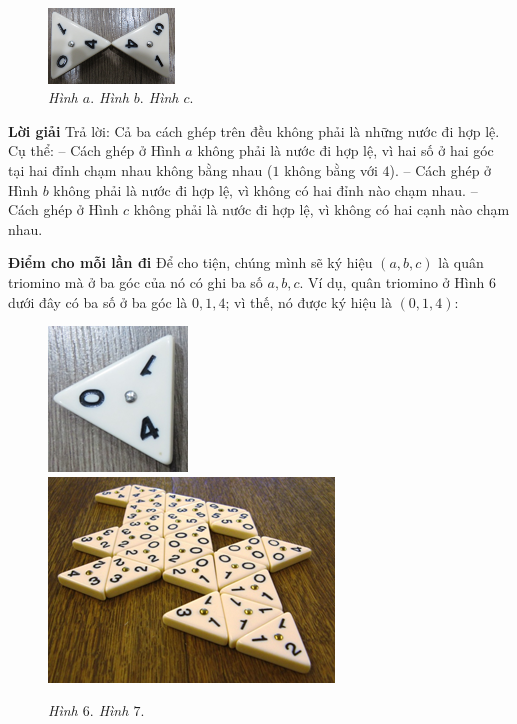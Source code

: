 {{\begin{figure}[H]
		\includegraphics[width=0.3\textwidth]{dom-10c}
		\caption{\textit{\small Hình $a.$ \hspace{70pt}Hình $b.$ \hspace{70pt}Hình $c.$ }}
		\vspace*{-5pt}
	\end{figure}
	{\textbf{\color{toancuabi} Lời giải}   %
	\vskip 0.1cm
	Trả lời: Cả ba cách ghép trên đều không phải là những nước đi hợp lệ. Cụ thể:
	\vskip 0.1cm
	-- Cách ghép ở Hình $a$ không phải là nước đi hợp lệ, vì hai số ở hai góc tại hai đỉnh chạm nhau không bằng nhau ($1$ không bằng với $4$).
	\vskip 0.1cm
	-- Cách ghép ở Hình $b$ không phải là nước đi hợp lệ, vì không có hai đỉnh nào chạm nhau.
	\vskip 0.1cm
	-- Cách ghép ở Hình $c$ không phải là nước đi hợp lệ, vì không có hai cạnh nào chạm nhau.
	\vskip 0.1cm
	{\textbf{\color{toancuabi} {Điểm cho mỗi lần đi}}   %
	\vskip 0.1cm
	Để cho tiện, chúng mình sẽ ký hiệu $(a, b, c)$ là quân triomino mà ở ba góc của nó có ghi ba số $a, b, c$. Ví dụ, quân triomino ở Hình $6$ dưới đây có ba số ở ba góc là $0, 1, 4$; vì thế, nó được ký hiệu là $(0, 1, 4)$:
	\begin{multicols}{2}
		\begin{figure}[H]
			\centering
			\vspace*{5pt}
			\captionsetup{labelformat=empty, justification=centering}
			\includegraphics[height=0.19\textwidth]{h4a}
			\includegraphics[height=0.19\textwidth]{h5a}
			\caption{\textit{\small Hình $6.$ \hspace{50pt}Hình $7.$}}
			\vspace*{-5pt}
		\end{figure}

\end{multicols}}}}}
